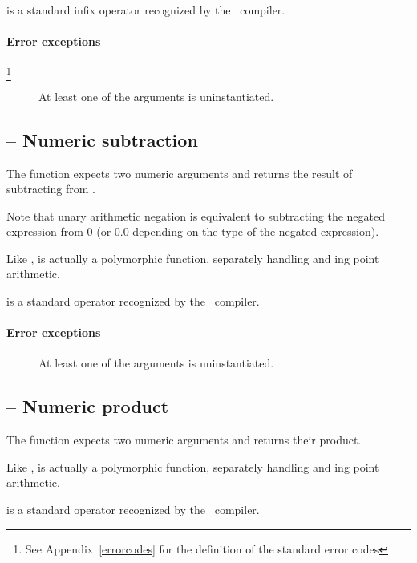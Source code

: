 \function{+} is a standard infix operator recognized by the \go\ compiler.
    
\paragraph{Error exceptions}\footnote{See Appendix~\vref{errorcodes} for the definition of the standard error codes}
\begin{description}
\item[]
At least one of the arguments is uninstantiated.
\end{description}

\subsection{\function{-} -- Numeric subtraction}
The \function{-} function expects two numeric arguments and returns the result of subtracting  from .

Note that unary arithmetic negation is equivalent to subtracting the negated expression from 0 (or 0.0 depending on the type of the negated expression).

Like \q{+}, \q{-} is actually a polymorphic function, separately handling  and ing point arithmetic.
    
\function{-} is a standard operator recognized by the \go\ compiler.
    
\paragraph{Error exceptions}
\begin{description}
\item[]
At least one of the arguments is uninstantiated.
\end{description}

\subsection{\function{*} -- Numeric product}
The \function{*} function expects two numeric arguments and returns their product.
    
Like \q{+}, \q{*} is actually a polymorphic function, separately handling  and ing point arithmetic.

\function{*} is a standard operator recognized by the \go\ compiler.
    

